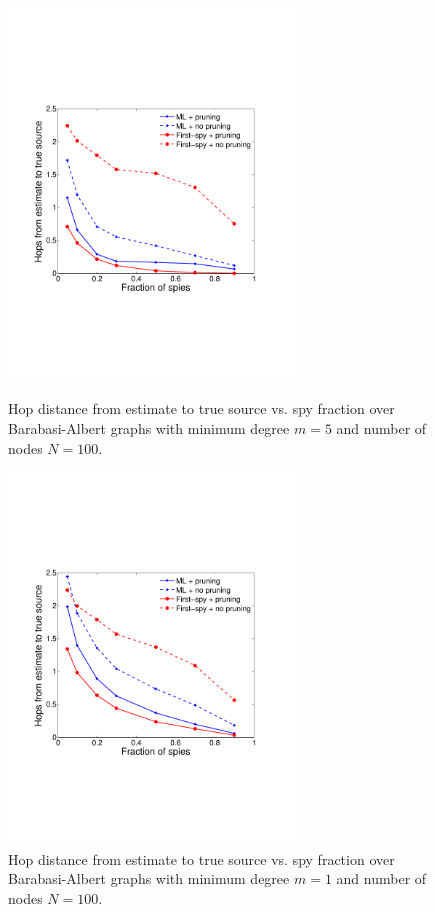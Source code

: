 \begin{figure}[ht]
  \begin{minipage}[b]{0.48\linewidth}
    \includegraphics[width=3in]{figures/ba_hops} 
    \caption{Hop distance from estimate to true source vs. spy fraction over Barabasi-Albert graphs with minimum degree $m=5$ and number of nodes $N=100$.} 
\label{fig:ba_hops}
  \end{minipage} 
  \hfill
  \begin{minipage}[b]{0.48\linewidth}
    \includegraphics[width=3in]{figures/ba_hops_p1} 
    \caption{Hop distance from estimate to true source vs. spy fraction over Barabasi-Albert graphs with minimum degree $m=1$ and number of nodes $N=100$.} 
  \end{minipage} 
\label{fig:ba_hops_p1}
\end{figure}


